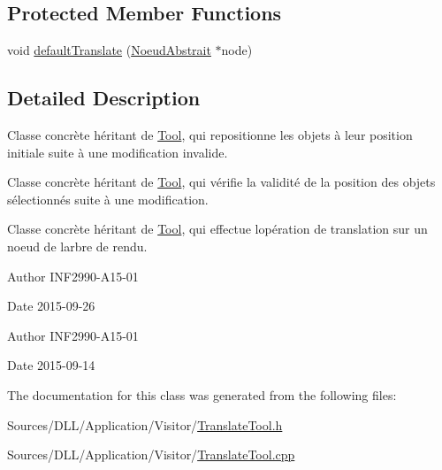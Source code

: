 \subsection*{Protected Member Functions}
\begin{DoxyCompactItemize}
\item 
void \hyperlink{group__inf2990_ga1e47597de16ebba1986441232607d6dc}{default\+Translate} (\hyperlink{class_noeud_abstrait}{Noeud\+Abstrait} $\ast$node)
\end{DoxyCompactItemize}


\subsection{Detailed Description}
Classe concrète héritant de \hyperlink{class_tool}{Tool}, qui repositionne les objets à leur position initiale suite à une modification invalide. 

Classe concrète héritant de \hyperlink{class_tool}{Tool}, qui vérifie la validité de la position des objets sélectionnés suite à une modification.

Classe concrète héritant de \hyperlink{class_tool}{Tool}, qui effectue l\textquotesingle{}opération de translation sur un noeud de l\textquotesingle{}arbre de rendu.

\begin{DoxyAuthor}{Author}
I\+N\+F2990-\/\+A15-\/01 
\end{DoxyAuthor}
\begin{DoxyDate}{Date}
2015-\/09-\/26
\end{DoxyDate}
\begin{DoxyAuthor}{Author}
I\+N\+F2990-\/\+A15-\/01 
\end{DoxyAuthor}
\begin{DoxyDate}{Date}
2015-\/09-\/14 
\end{DoxyDate}


The documentation for this class was generated from the following files\+:\begin{DoxyCompactItemize}
\item 
Sources/\+D\+L\+L/\+Application/\+Visitor/\hyperlink{_translate_tool_8h}{Translate\+Tool.\+h}\item 
Sources/\+D\+L\+L/\+Application/\+Visitor/\hyperlink{_translate_tool_8cpp}{Translate\+Tool.\+cpp}\end{DoxyCompactItemize}
